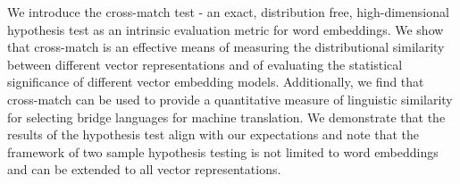 We introduce the cross-match test - an exact, distribution free, high-dimensional hypothesis test as an intrinsic evaluation metric for word embeddings. We show that cross-match is an effective means of measuring the distributional similarity between different vector representations and of evaluating the statistical significance of different vector embedding models. Additionally, we find that cross-match can be used to provide a quantitative measure of linguistic similarity for selecting bridge languages for machine translation. We demonstrate that the results of the hypothesis test align with our expectations and note that the framework of two sample hypothesis testing is not limited to word embeddings and can be extended to all vector representations.
